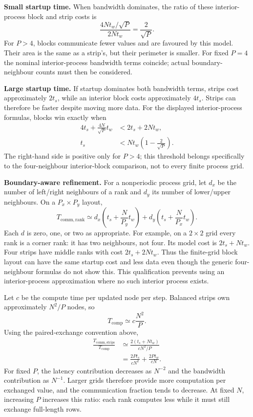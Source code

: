 \textbf{Small startup time.}
When bandwidth dominates, the ratio of these interior-process block and strip costs is
\[
\frac{4Nt_w/\sqrt P}{2Nt_w}=\frac{2}{\sqrt P}.
\]
For $P>4$, blocks communicate fewer values and are favoured by this model. Their area is the
same as a strip's, but their perimeter is smaller. For fixed $P=4$ the nominal interior-process
bandwidth terms coincide; actual boundary-neighbour counts must then be considered.

\textbf{Large startup time.}
If startup dominates both bandwidth terms, strips cost approximately $2t_s$, while an
interior block costs approximately $4t_s$. Strips can therefore be faster despite moving
more data. For the displayed interior-process formulas, blocks win exactly when
\begin{align*}
4t_s+\frac{4N}{\sqrt P}t_w&<2t_s+2Nt_w,\\
t_s&<Nt_w\left(1-\frac{2}{\sqrt P}\right).
\end{align*}
The right-hand side is positive only for $P>4$; this threshold belongs specifically to the
four-neighbour interior-block comparison, not to every finite process grid.

\textbf{Boundary-aware refinement.}
For a nonperiodic process grid, let $d_x$ be the number of left/right neighbours of a rank
and $d_y$ its number of lower/upper neighbours. On a $P_x\times P_y$ layout,
\[
T_{\mathrm{comm,rank}}\simeq
d_x\left(t_s+\frac{N}{P_y}t_w\right)
+d_y\left(t_s+\frac{N}{P_x}t_w\right).
\]
Each $d$ is zero, one, or two as appropriate. For example, on a $2\times2$ grid every rank
is a corner rank: it has two neighbours, not four. Its model cost is
$2t_s+Nt_w$. Four strips have middle ranks with cost $2t_s+2Nt_w$.
Thus the finite-grid block layout can have the same startup cost and less data even though
the generic four-neighbour formulas do not show this. This qualification prevents using an
interior-process approximation where no such interior process exists.

Let $c$ be the compute time per updated node per step. Balanced strips own approximately
$N^2/P$ nodes, so
\[
T_{\mathrm{comp}}\simeq c\frac{N^2}{P}.
\]
Using the paired-exchange convention above,
\begin{align*}
\frac{T_{\mathrm{comm,strips}}}{T_{\mathrm{comp}}}
&\simeq\frac{2(t_s+Nt_w)}{cN^2/P}\\
&=\boxed{\frac{2Pt_s}{cN^2}+\frac{2Pt_w}{cN}.}
\end{align*}
For fixed $P$, the latency contribution decreases as $N^{-2}$ and the bandwidth contribution
as $N^{-1}$. Larger grids therefore provide more computation per exchanged value, and the
communication fraction tends to decrease. At fixed $N$, increasing $P$ increases this ratio:
each rank computes less while it must still exchange full-length rows.

